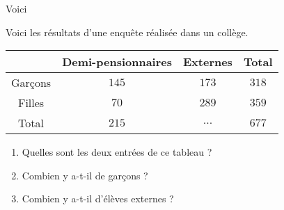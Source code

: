 \begin{pageAD} 



Voici 




Voici les résultats d'une enquête réalisée dans un collège.
 \begin{center}
 \begin{tabular}{c||c|c|c}
  & Demi-pensionnaires & Externes & Total \\\hline \hline
  Garçons & $145$ & $173$ & $318$ \\\hline
  Filles & $70$ & $289$ & $359$ \\\hline
  Total & $215$ & $...$ & $677$ \\
 \end{tabular}
 \end{center}
 \begin{enumerate}
 \item Quelles sont les deux entrées de ce tableau ? 
 \item Combien y a-t-il de garçons ? 
 \item Combien y a-t-il d'élèves externes ? 
\end{enumerate}


\end{pageAD}



